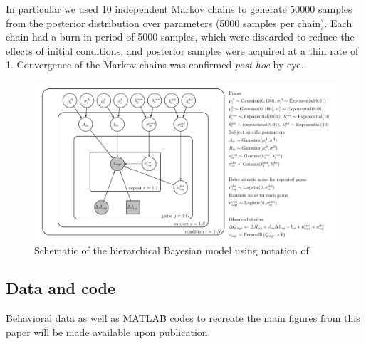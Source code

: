 \documentclass[12pt]{article}
\begin{document}
	In particular we used 10 independent Markov chains to generate 50000 samples from the posterior distribution over parameters (5000 samples per chain).  Each chain had a burn in period of 5000 samples, which were discarded to reduce the effects of initial conditions, and posterior samples were acquired at a thin rate of 1.  Convergence of the Markov chains was confirmed {\it post hoc} by eye. 
	
	\begin{figure}[H]
		\begin{center}
			\includegraphics[width=1\textwidth]{figures/EEHorizon_2sigma.pdf}
			\caption{Schematic of the hierarchical Bayesian model using notation of \cite{lee_wagenmakers_2014}}
			\label{fig:model}
		\end{center}
	\end{figure}
	
	\subsection*{Data and code}
	Behavioral data as well as MATLAB codes to recreate the main figures from this paper will be made available upon publication. %
	
	
	
	
	
	\cleardoublepage
	\ifdefined{}
	\else
	\fi
	
	
	
\end{document}
